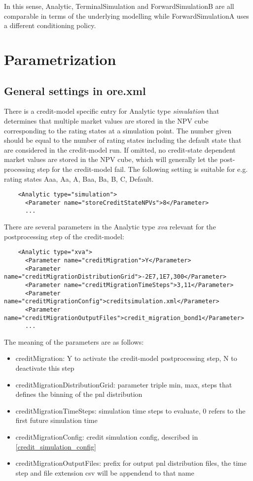 \documentclass[12pt, a4paper]{article}
\begin{document}
In this sense, Analytic, TerminalSimulation and ForwardSimulationB are all comparable in terms of the underlying
modelling while ForwardSimulationA uses a different conditioning policy.

\section{Parametrization}

\subsection{General settings in ore.xml}\label{general_settings}

There is a credit-model specific entry for Analytic type {\em simulation} that determines that multiple market values
are stored in the NPV cube corresponding to the rating states at a simulation point. The number given should be equal to
the number of rating states including the default state that are considered in the credit-model run. If omitted, no
credit-state dependent market values are stored in the NPV cube, which will generally let the post-processing step for
the credit-model fail. The following setting is suitable for e.g. rating states Aaa, Aa, A, Baa, Ba, B, C, Default.

\begin{verbatim}
    <Analytic type="simulation">
      <Parameter name="storeCreditStateNPVs">8</Parameter>
      ...
\end{verbatim}

There are several parameters in the Analytic type {\em xva} relevant for the postprocessing step of the credit-model:

\begin{verbatim}
    <Analytic type="xva">
      <Parameter name="creditMigration">Y</Parameter>
      <Parameter name="creditMigrationDistributionGrid">-2E7,1E7,300</Parameter>
      <Parameter name="creditMigrationTimeSteps">3,11</Parameter>
      <Parameter name="creditMigrationConfig">creditsimulation.xml</Parameter>
      <Parameter name="creditMigrationOutputFiles">credit_migration_bond1</Parameter>
      ...
\end{verbatim}

The meaning of the parameters are as follows:

\begin{itemize}
\item creditMigration: Y to activate the credit-model postprocessing step, N to deactivate this step
\item creditMigrationDistributionGrid: parameter triple min, max, steps that defines the binning of the pnl distribution
\item creditMigrationTimeSteps: simulation time steps to evaluate, 0 refers to the first future simulation time
\item creditMigrationConfig: credit simulation config, described in \ref{credit_simulation_config}
\item creditMigrationOutputFiles: prefix for output pnl distribution files, the time step and file extension csv will be
  appendend to that name
\end{itemize}
\end{document}
